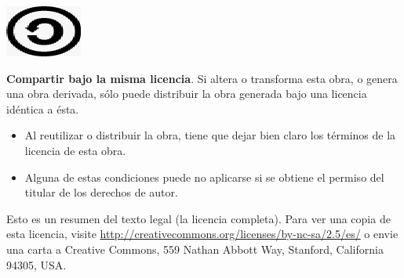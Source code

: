 \begin{center}
{\begin{minipage}{175mm}
\begin{minipage}[t]{20mm}
  \vspace*{0mm}\hspace*{1em}
  \includegraphics[scale=0.35]{licencia/deed_002.png}
\end{minipage}%
\begin{minipage}[t]{15cm}
  \vspace*{-2mm}
  {\bf Compartir bajo la misma licencia}. Si altera o transforma esta obra, o
  genera una obra derivada, sólo puede distribuir la obra generada bajo una
  licencia idéntica a ésta. 
\end{minipage}

\begin{itemize}    
\item Al reutilizar o distribuir la obra, tiene que dejar bien claro los
  términos de la licencia de esta obra. 
\item Alguna de estas condiciones puede no aplicarse si se obtiene el permiso
 del titular de los derechos de autor.
\end{itemize}
\vspace*{1ex}
\end{minipage}}
\end{center}

\vspace*{4ex}

Esto es un resumen del texto legal (la licencia completa). Para ver una copia
de esta licencia, visite 
\href{http://creativecommons.org/licenses/by-nc-sa/2.5/es/}
     {\url{http://creativecommons.org/licenses/by-nc-sa/2.5/es/}}
o envie una carta a Creative Commons, 559 Nathan Abbott Way, Stanford,
California 94305, USA.

